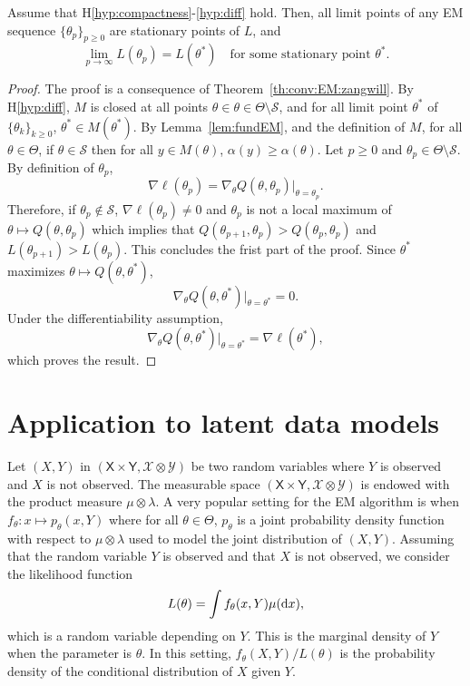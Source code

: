 \documentclass[english,graybox,envcountchap,envcountsame,sectrefs,shortlabels]{svmono}
\theoremstyle{style}
\newcommand{\eqsp}{}
\begin{document}
\begin{theorem}
Assume that H\ref{hyp:compactness}-\ref{hyp:diff} hold. 
Then, all limit points of any EM sequence $\{\theta_p\}_{p\geq 0}$ are stationary points of $L$, and
\[
\lim_{p\to \infty}L(\theta_p)  = L(\theta^*)
\quad \text{for some stationary point } \theta^*\eqsp.
\]
\end{theorem}

\begin{proof}
The proof is a consequence of Theorem~\ref{th:conv:EM:zangwill}.  By H\ref{hyp:diff}, $M$ is closed at all points $\theta\in \theta \in \Theta \setminus \mathcal{S}$, and for all limit point $\theta^*$ of  $\{\theta_k\}_{k\geq 0}$, $\theta^* \in M(\theta^*)$. By Lemma~\ref{lem:fundEM}, and the definition of $M$, for all $\theta \in \Theta$,  if $\theta\in \mathcal{S}$ then for all $y \in M(\theta)$, $\alpha(y) \geq \alpha(\theta)$. %
Let $p\geq 0$ and $\theta_p\in\Theta\setminus \mathcal{S}$. By definition of $\theta_p$, 
$$
\nabla \ell(\theta_p) = \nabla_\theta Q(\theta, \theta_p) \big|_{\theta=\theta_p}\eqsp.
$$
Therefore, if $\theta_p\notin \mathcal{S}$, $\nabla \ell(\theta_p)\neq 0$ and $\theta_p$ is not a local maximum of $\theta\mapsto Q(\theta, \theta_p)$ which implies that $Q(\theta_{p+1}, \theta_p)>Q(\theta_p, \theta_p)$ and $L(\theta_{p+1}) > L(\theta_p)$. This concludes the frist part of the proof. Since $\theta^*$ maximizes $\theta\mapsto Q(\theta, \theta^*)$,
\[
\nabla_\theta Q(\theta, \theta^*) \big|_{\theta=\theta^*} = 0\eqsp.
\]
Under the differentiability assumption, 
\[
\nabla_\theta Q(\theta, \theta^*) \big|_{\theta=\theta^*} = \nabla \ell(\theta^*)\eqsp,
\]
which proves the result.
\end{proof}



\section{Application to latent data models}
 Let $(X,Y)$ in $(\mathsf{X}\times\mathsf{Y}, \mathcal{X}\otimes\mathcal{Y})$ be two random variables where $Y$ is observed and $X$ is not observed. The measurable space $(\mathsf{X}\times\mathsf{Y}, \mathcal{X}\otimes\mathcal{Y})$ is endowed with the product measure $\mu\otimes \lambda$. A very popular setting for the EM algorithm is when $f_\theta: x \mapsto p_\theta(x,Y)$ where for all $\theta\in\Theta$, $p_\theta$ is a joint probability density function with respect to $\mu\otimes \lambda$  used to model the joint distribution of $(X,Y)$. Assuming that the random variable $Y$ is observed and that $X$ is not observed, we consider the likelihood function
$$
L(\theta) = \int f_\theta(x,Y)\mu(\rmd x)\eqsp,
$$
which is a random variable depending on $Y$. This is the marginal density of $Y$ when the parameter is $\theta$. In this setting, $f_\theta(X,Y)/L(\theta)$ is the probability density of the conditional distribution of $X$ given $Y$.  
\end{document}
